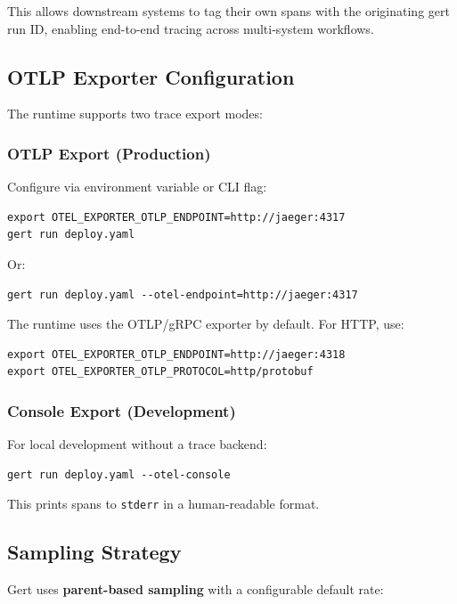 This allows downstream systems to tag their own spans with the originating gert run ID, enabling end-to-end tracing across multi-system workflows.

\subsection{OTLP Exporter Configuration}

The runtime supports two trace export modes:

\subsubsection{OTLP Export (Production)}

Configure via environment variable or CLI flag:

\begin{verbatim}
export OTEL_EXPORTER_OTLP_ENDPOINT=http://jaeger:4317
gert run deploy.yaml
\end{verbatim}

Or:

\begin{verbatim}
gert run deploy.yaml --otel-endpoint=http://jaeger:4317
\end{verbatim}

The runtime uses the OTLP/gRPC exporter by default. For HTTP, use:

\begin{verbatim}
export OTEL_EXPORTER_OTLP_ENDPOINT=http://jaeger:4318
export OTEL_EXPORTER_OTLP_PROTOCOL=http/protobuf
\end{verbatim}

\subsubsection{Console Export (Development)}

For local development without a trace backend:

\begin{verbatim}
gert run deploy.yaml --otel-console
\end{verbatim}

This prints spans to \texttt{stderr} in a human-readable format.

\subsection{Sampling Strategy}

Gert uses \textbf{parent-based sampling} with a configurable default rate:

